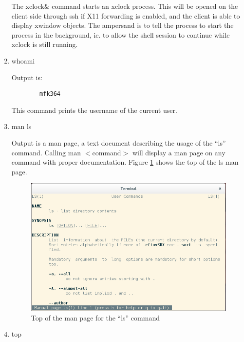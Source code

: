 \documentclass[a4paper,12pt]{UoBnote}
\begin{document}
\begin{enumerate}[label=\alph*)]
		The xclock\& command starts an xclock process. This will be opened on the client side through ssh if X11 forwarding is enabled, and the client is able to display xwindow objects. The ampersand is to tell the process to start the process in the background, ie. to allow the shell session to continue while xclock is still running.
	\item whoami

		Output is:
		\begin{verbatim}
		mfk364
		\end{verbatim}

		This command prints the username of the current user.

	\item man ls

		Output is a man page, a text document describing the usage of the ``ls'' command. Calling man $<$command$>$ will display a man page on any command with proper documentation. Figure \ref{fig:manpage} shows the top of the ls man page.
		\begin{figure}
			\centering
			\includegraphics[scale=0.5]{manls}
			\caption{Top of the man page for the ``ls'' command}
			\label{fig:manpage}
		\end{figure}

	\item top


\end{enumerate}
\end{document}
